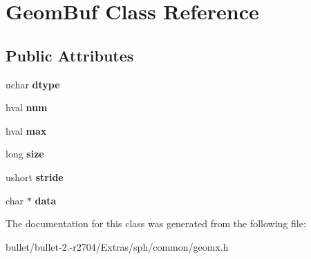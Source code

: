 \hypertarget{class_geom_buf}{\section{Geom\+Buf Class Reference}
\label{class_geom_buf}
}
\subsection*{Public Attributes}
\begin{DoxyCompactItemize}
\item 
\hypertarget{class_geom_buf_af226ba2148d3dd0423e23bb4687f0c3f}{uchar {\bfseries dtype}}\label{class_geom_buf_af226ba2148d3dd0423e23bb4687f0c3f}

\item 
\hypertarget{class_geom_buf_a429d717ca567046a56dad3ed12d15cd8}{hval {\bfseries num}}\label{class_geom_buf_a429d717ca567046a56dad3ed12d15cd8}

\item 
\hypertarget{class_geom_buf_a9c0db7402470d456c25c3ec85bfe65dd}{hval {\bfseries max}}\label{class_geom_buf_a9c0db7402470d456c25c3ec85bfe65dd}

\item 
\hypertarget{class_geom_buf_a90e3930978e865806a415d20721ffa07}{long {\bfseries size}}\label{class_geom_buf_a90e3930978e865806a415d20721ffa07}

\item 
\hypertarget{class_geom_buf_a6438159fc49ee092d08b19fdced6acdd}{ushort {\bfseries stride}}\label{class_geom_buf_a6438159fc49ee092d08b19fdced6acdd}

\item 
\hypertarget{class_geom_buf_a539508ae2ec9dca724b0b395bd2cd3d2}{char $\ast$ {\bfseries data}}\label{class_geom_buf_a539508ae2ec9dca724b0b395bd2cd3d2}

\end{DoxyCompactItemize}


The documentation for this class was generated from the following file\+:\begin{DoxyCompactItemize}
\item 
bullet/bullet-\/2.-\/r2704/\+Extras/sph/common/geomx.\+h\end{DoxyCompactItemize}
